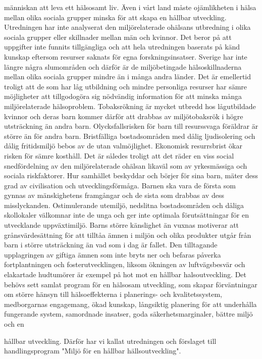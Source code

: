 människan att leva ett hälsosamt liv. Även i vårt land måste ojämlikheten i hälsa mellan olika sociala grupper minska för att skapa en hållbar utveckling.
Utredningen har inte analyserat den miljörelaterade ohälsans utbredning i olika sociala grupper eller skillnader mellan män och kvinnor. Det beror på att uppgifter inte funnits tillgängliga och att hela utredningen baserats på känd kunskap eftersom resurser saknats för egna forskningsinsatser. Sverige har inte längre några slumområden och därför är de miljöbetingade hälsoskillnaderna mellan olika sociala grupper mindre än i många andra länder. Det är emellertid troligt att de som har låg utbildning och mindre personliga resurser har sämre möjligheter att tillgodogöra sig nödvändig information för att minska många miljörelaterade hälsoproblem. Tobaksrökning är mycket utbredd hos lågutbildade kvinnor och deras barn kommer därför att drabbas av miljötobaksrök i högre utsträckning än andra barn. Olycksfallsrisken för barn till resurssvaga föräldrar är större än för andra barn. Bristfälliga bostadsområden med dålig ljudisolering och dålig fritidsmiljö bebos av de utan valmöjlighet. Ekonomisk resurrsbrist ökar risken för sämre kosthåll. Det är således troligt att det räder en viss social snedfördelning av den miljörelaterade ohälsan likaväl som av yrkesmässiga och sociala riskfaktorer.
Hur samhället beskyddar och börjer för sina barn, mäter dess grad av civilisation och utvecklingsförmåga. Barnen ska vara de första som gynnas av mänskighetens framgångar och de sista som drabbas av dess misslyckanden. Ostimulerande utemiljö, nedslitna bostadsområden och dåliga skollokaler välkomnar inte de unga och ger inte optimala förutsättningar för en utvecklande uppväxtimiljö. Barns större känslighet än vuxnas motiverar att grånsvärdesättning för att tilltåa ämnen i miljön och olika produkter utgår från barn i större utsträckning än vad som i dag är fallet.
Den tilltagande upplagringen av giftiga ämnen som inte bryts ner och befaras påverka fortplantningen och fosterutvecklingen, liksom ökningen av luftvägsbesvär och elakartade hudtumörer är exempel på hot mot en hållbar halsoutveckling. Det behövs sett samlat program för en hälsosam utveckling, som skapar förväntningar om större hänsyn till hälsoeffekterna i planerings- och kvalitetssystem, medborgarnas engagemang, ökad kunskap, långsiktig planering för att underhålla fungerande system, samordnade insatser, goda säkerhetsmarginaler, bättre miljö och en

hållbar utveckling. Därför har vi kallat utredningen och förslaget till handlingsprogram "Miljö för en hållbar hällsoutveckling".

